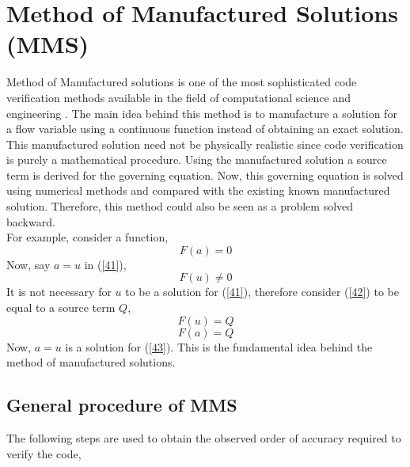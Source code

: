 \chapter{Method of Manufactured Solutions (MMS)}
\label{ch:mmsd}
\hspace{0.25cm}Method of Manufactured solutions is one of the most sophisticated code verification methods available in the field of computational science and engineering \cite{codemms}. The main idea behind this method is to manufacture a solution for a flow variable using a continuous function instead of obtaining an exact solution. This manufactured solution need not be physically realistic since code verification is purely a mathematical procedure. Using the manufactured solution a source term is derived for the governing equation. Now, this governing equation is solved using numerical methods and compared with the existing known manufactured solution. Therefore, this method could also be seen as a problem solved backward. \\
For example, consider a function,
\begin{equation}\label{41}
    F(a)=0
\end{equation}
Now, say $a=u$ in (\ref{41}),
\begin{equation}\label{42}
    F(u)\neq0
\end{equation}
It is not necessary for $u$ to be a solution for (\ref{41}), therefore consider (\ref{42}) to be equal to a source term $Q$,
\begin{equation}\label{442}
    F(u)=Q
\end{equation}
\begin{equation}\label{43}
    F(a)=Q
\end{equation}
Now, $a=u$ is a solution for (\ref{43}). This is the fundamental idea behind the method of manufactured solutions.
\section{General procedure of MMS}
\hspace{0.25cm}The following steps are used to obtain the observed order of accuracy required to verify the code,
\\


